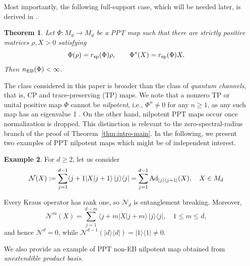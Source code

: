 \documentclass[11pt,reqno]{amsart}
\newtheorem{theorem}{Theorem}[section]
\theoremstyle{definition}
\theoremstyle{definition}
\theoremstyle{definition}
\newtheorem{example}[theorem]{Example}
\theoremstyle{definition}
\newcommand{\la}{\langle}
\newcommand{\ra}{\rangle}
\newcommand{\Ad}{{\rm Ad}}
\newcommand{\proj}[1]{|#1\rangle\langle #1|}
\begin{document}
Most importantly, the following full-support case, which will be needed later, is derived in \cite[Theorem 3.14]{HRSF20}.

\begin{theorem}\label{thm:HRSF-full-support}
Let $\Phi:M_d\to M_d$ be a PPT map such that there are strictly
positive matrices $\rho,X>0$ satisfying
$$
 \Phi(\rho)=r_{\rm sp}(\Phi)\rho,
 \qquad
 \Phi^*(X)=r_{\rm sp}(\Phi)X.
$$
Then $n_{\rm EB}(\Phi)<\infty$.
\end{theorem}

{
The class considered in this paper is broader than the class of \emph{quantum channels}, that is, CP and trace-preserving (TP) maps. We note that a nonzero TP or unital positive map $\Phi$ cannot be \emph{nilpotent}, i.e., $\Phi^n\neq 0$ for any $n\geq 1$, as any such map has an eigenvalue 1 \cite{Wol12}. On the other hand, nilpotent PPT maps occur once normalization is dropped. This distinction is relevant to the zero-spectral-radius branch of the proof of Theorem~\ref{thm:intro-main}. In the following, we present two examples of PPT nilpotent maps which might be of independent interest.
}

\begin{example}
For $d\geq2$, let us consider
    $$\mathcal{N}(X):=\sum_{j=1}^{d-1}\la j+1|X|j+1\ra \,|j\ra\la j| =\sum_{j=1}^{d-1}\Ad_{|j\rangle\langle j+1|}(X), \quad X\in M_d$$
 
Every Kraus operator has rank one, so $\mathcal{N}_d$ is entanglement breaking. Moreover,
    $$\mathcal{N}^m(X) =\sum_{j=1}^{d-m}\langle j+m|X|j+m\rangle\, |j\ra\la j|,
 \quad 1\leq m\leq d,$$
and hence $\mathcal{N}^d=0$, while $\mathcal{N}^{d-1}(\proj{d})=\proj{1}\neq0$.
\end{example}

We also provide an example of PPT non-EB nilpotent map obtained from \emph{unextendible product basis}.
\end{document}
